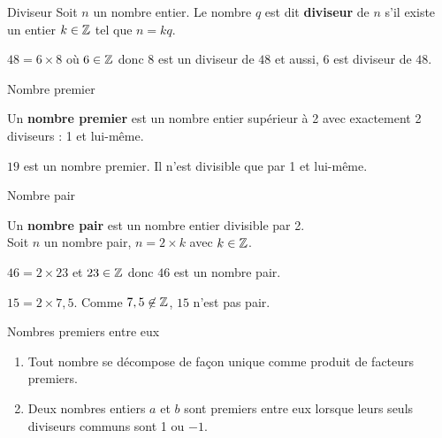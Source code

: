 \begin{pageCours}
\begin{minipage}{0.5\linewidth}
\begin{DefT}{Diviseur}
Soit $n$ un nombre entier. Le nombre $q$ est dit \textbf{diviseur} de $n$ s'il existe un entier $k \in \mathbb Z$ tel que $n=kq$.
\end{DefT}
\end{minipage}
\begin{minipage}{0.5\linewidth}
\begin{Ex} 

$48 = 6 \times 8$ où $6 \in \mathbb Z$  donc $8$ est un diviseur de $48$ et aussi,  $6$ est diviseur de $48$.
\end{Ex}
\end{minipage}

\begin{minipage}{0.5\linewidth}
\begin{DefT}{Nombre premier}

Un \textbf{nombre premier} est un nombre entier supérieur à 2 avec exactement 2 diviseurs : 1 et lui-même. 

\end{DefT}
\end{minipage}
\begin{minipage}{0.5\linewidth}
\begin{Ex} 

$19$ est un nombre premier. Il n'est divisible que par 1 et lui-même. 
\end{Ex}
\end{minipage}


\begin{minipage}{0.5\linewidth}
\begin{DefT}{Nombre pair}

Un \textbf{nombre pair} est un nombre entier divisible par 2. \\  Soit $n$ un nombre pair, $n=2\times k$ avec $k\in\mathbb Z$.

\end{DefT}
\end{minipage}
\begin{minipage}{0.5\linewidth}
\begin{Ex} 
$46 = 2 \times 23$ et $23\in\mathbb Z$ donc $46$ est un nombre pair.

$15= 2 \times 7,5$. Comme $7,5 \not\in\mathbb Z$, $15$ n'est pas pair.
\end{Ex}
\end{minipage}


\begin{minipage}{0.5\linewidth}
\begin{DefT}{Nombres premiers entre eux}
\begin{enumerate}[leftmargin=*]
\item Tout nombre se décompose de façon unique comme produit de facteurs premiers.
\item Deux nombres entiers $a$ et $b$ sont premiers entre eux lorsque leurs seuls diviseurs communs sont 1 ou $-1$.
\end{enumerate}
\end{DefT}
\end{minipage}
\begin{minipage}{0.5\linewidth}
\begin{Att}
 

\end{Att}
\end{minipage}
\end{pageCours}
